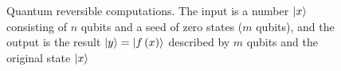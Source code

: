 \begin{figure}
\centering



\caption{Quantum reversible computations. The input is a number
  $\ket{x}$ consisting of $n$ qubits and a seed of zero
  states ($m$ qubits), and the output is the result $\ket{y} =
  \left|f\left(x\right)\right>$ described by $m$ qubits and the original
  state $\ket{x}$}
\label{figQuantCompQuantComp}
\end{figure}